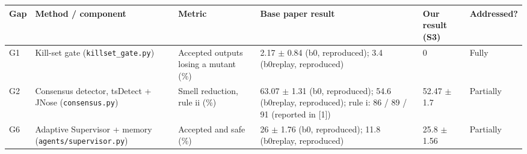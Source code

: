 \begin{tabular}{p{0.6cm}p{2.6cm}p{2.2cm}p{3.2cm}p{1.6cm}p{1.4cm}}
\toprule
Gap & Method / component & Metric & Base paper result & Our result (S3) & Addressed? \\
\midrule
G1 & Kill-set gate (\texttt{killset\_gate.py}) & Accepted outputs losing a mutant (\%) & 2.17 $\pm$ 0.84 (b0, reproduced); 3.4 (b0replay, reproduced) & 0 & Fully \\
G2 & Consensus detector, tsDetect + JNose (\texttt{consensus.py}) & Smell reduction, rule ii (\%) & 63.07 $\pm$ 1.31 (b0, reproduced); 54.6 (b0replay, reproduced); rule i: 86 / 89 / 91 (reported in [1]) & 52.47 $\pm$ 1.7 & Partially \\
G6 & Adaptive Supervisor + memory (\texttt{agents/supervisor.py}) & Accepted and safe (\%) & 26 $\pm$ 1.76 (b0, reproduced); 11.8 (b0replay, reproduced) & 25.8 $\pm$ 1.56 & Partially \\
\bottomrule
\end{tabular}
